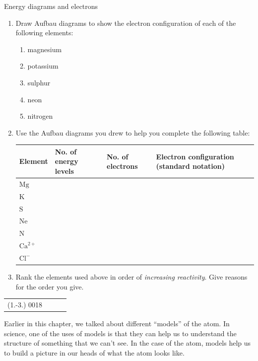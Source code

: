 \begin{exercises}{Energy diagrams and electrons}
            \nopagebreak \noindent \vspace{-2cm}
        \label{m38741*id260063}\begin{enumerate}[noitemsep, label=\textbf{\arabic*}. ] 
            \label{m38741*uid106}\item Draw Aufbau diagrams to show the electron configuration of each of the following elements:
\begin{multicols}{2}
\label{m38741*id260079}\begin{enumerate}[noitemsep, label=\textbf{\alph*}. ] 
            \label{m38741*uid107}\item magnesium
\label{m38741*uid108}\item potassium
\label{m38741*uid109}\item sulphur
\label{m38741*uid110}\item neon
\label{m38741*uid111}\item nitrogen
\end{enumerate}
\end{multicols}
        \label{m38741*uid112}\item Use the Aufbau diagrams you drew to help you complete the following table:
       \begin{center}
\begin{tabular}{|p{1.6cm}|p{2.6cm}|p{2.6cm}|p{2.6cm}|}\hline
\textbf{Element} & \textbf{No.\@{} of energy levels} & \textbf{No.\@{} of electrons}  & \textbf{Electron configuration (standard notation)}\\\hline
$\text{Mg}$ & &  & \\\hline
$\text{K}$ & &  & \\\hline
$\text{S}$ & & & \\\hline
$\text{Ne}$ &  & & \\\hline
$\text{N}$ & & & \\\hline
$\text{Ca}^{2+}$ & & & \\\hline
$\text{Cl}^{-}$ & & & \\\hline
\end{tabular}
\end{center}    
  \label{m38741*uid113}\item Rank the elements used above in order of \textsl{increasing reactivity}. Give reasons for the order you give.
 \end{enumerate}
\practiceinfo
 \par \begin{tabular}[h]{cccc}
 (1.-3.) 0018 & & & \end{tabular}
\end{exercises}            
            \label{m38741*id260472}Earlier in this chapter, we talked about different ``models'' of the atom. In science, one of the uses of models is that they can help us to understand the structure of something that we can't see. In the case of the atom, models help us to build a picture in our heads of what the atom looks like.\par 

